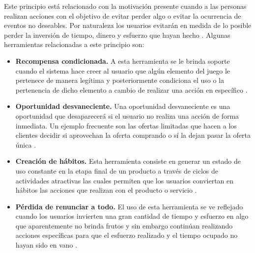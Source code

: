  Este principio está relacionado con la motivación presente cuando a las personas realizan acciones
 con el objetivo de evitar perder algo o evitar la ocurrencia de eventos no deseables. Por naturaleza
 los usuarios evitarán en medida de lo posible perder la inversión de tiempo, dinero y esfuerzo que
 hayan hecho \cite[p. 311]{Octalysis}. Algunas herramientas relacionadas a este principio son:

    \begin{itemize}
    \item
    {\bf Recompensa condicionada.}
        A esta herramienta se le brinda soporte cuando el sistema hace creer al
        usuario que algún elemento del juego le pertenece de manera legítima y
        posteriormente condiciona el uso o la pertenencia de dicho elemento a
        cambio de realizar una acción en específico \cite[p. 330]{Octalysis}.

    \item
    {\bf Oportunidad desvaneciente.}
        Una oportunidad desvaneciente es una oportunidad que desaparecerá si el usuario no
        realiza una acción de forma inmediata. Un ejemplo frecuente son las ofertas limitadas
        que hacen a los clientes decidir si aprovechan la oferta comprando o sí la dejan
        pasar la oferta única \cite[p. 333]{Octalysis}.

    \item
    {\bf Creación de hábitos.}
        Esta herramienta consiste en generar un estado de uso constante en la etapa final
        de un producto a través de ciclos de actividades atractivas las cuales permiten que
        los usuarios conviertan en hábitos las acciones que realizan con el producto o servicio
        \cite[p. 334]{Octalysis}.

    \item
    {\bf Pérdida de renunciar a todo.}
        El uso de esta herramienta se ve reflejado cuando los usuarios invierten una gran
        cantidad de tiempo y esfuerzo en algo que aparentemente no brinda frutos y sin
        embargo continúan realizando acciones específicas para que el esfuerzo realizado y el
        tiempo ocupado no hayan sido en vano \cite[p. 338]{Octalysis}.

    \end{itemize}

\clearpage
